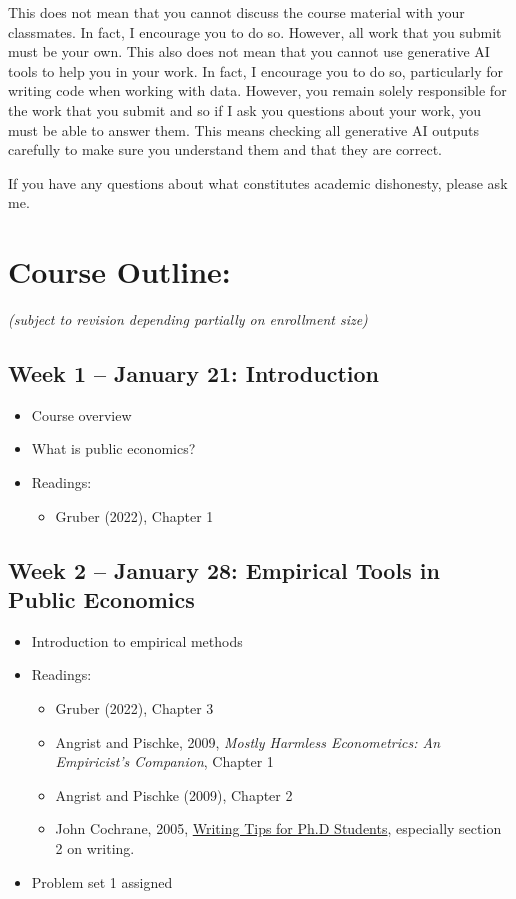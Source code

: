\documentclass[11pt]{article}
\begin{document}
This does not mean that you cannot discuss the course material with your classmates. In fact, I encourage you to do so. However, all work that you submit must be your own. This also does not mean that you cannot use generative AI tools to help you in your work. In fact, I encourage you to do so, particularly for writing code when working with data. However, you remain solely responsible for the work that you submit and so if I ask you questions about your work, you must be able to answer them. This means checking all generative AI outputs carefully to make sure you understand them and that they are correct. 

If you have any questions about what constitutes academic dishonesty, please ask me. 

\section*{Course Outline:}
\textit{(subject to revision depending partially on enrollment size)}

\subsection*{Week 1 -- January 21: Introduction}
\begin{itemize}
    \setlength{\itemsep}{0em}
    \item Course overview
    \item What is public economics?
    \item Readings:
    \begin{itemize}
        \item Gruber (2022), Chapter 1
    \end{itemize}
\end{itemize}

\subsection*{Week 2 -- January 28: Empirical Tools in Public Economics}
\begin{itemize}
    \setlength{\itemsep}{0em}
    \item Introduction to empirical methods
    \item Readings:
    \begin{itemize}
        \item Gruber (2022), Chapter 3
        \item Angrist and Pischke, 2009, \textit{Mostly Harmless Econometrics: An Empiricist's Companion}, Chapter 1
        \item Angrist and Pischke (2009), Chapter 2
        \item John Cochrane, 2005, \href{https://static1.squarespace.com/static/5e6033a4ea02d801f37e15bb/t/5eda74919c44fa5f87452697/1591374993570/phd_paper_writing.pdf}{Writing Tips for Ph.D Students}, especially section 2 on writing.
    \end{itemize}
    \item Problem set 1 assigned
\end{itemize}
\end{document}
